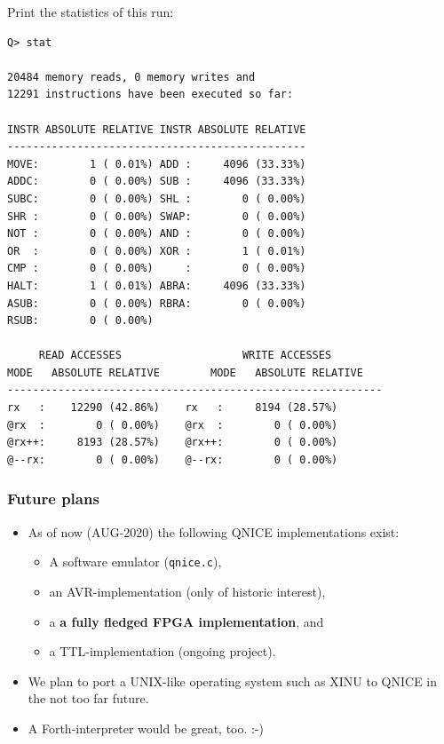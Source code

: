 \documentclass{beamer}
\begin{document}
  \begin{frame}[containsverbatim]
   \begin{description}
    \item [Print the statistics of this run:]
   \end{description}
   {\tiny
    \begin{verbatim}
Q> stat

20484 memory reads, 0 memory writes and
12291 instructions have been executed so far:

INSTR ABSOLUTE RELATIVE INSTR ABSOLUTE RELATIVE
-----------------------------------------------
MOVE:        1 ( 0.01%) ADD :     4096 (33.33%) 
ADDC:        0 ( 0.00%) SUB :     4096 (33.33%) 
SUBC:        0 ( 0.00%) SHL :        0 ( 0.00%) 
SHR :        0 ( 0.00%) SWAP:        0 ( 0.00%) 
NOT :        0 ( 0.00%) AND :        0 ( 0.00%) 
OR  :        0 ( 0.00%) XOR :        1 ( 0.01%) 
CMP :        0 ( 0.00%)     :        0 ( 0.00%) 
HALT:        1 ( 0.01%) ABRA:     4096 (33.33%) 
ASUB:        0 ( 0.00%) RBRA:        0 ( 0.00%) 
RSUB:        0 ( 0.00%) 

     READ ACCESSES                   WRITE ACCESSES
MODE   ABSOLUTE RELATIVE        MODE   ABSOLUTE RELATIVE
-----------------------------------------------------------
rx   :    12290 (42.86%)    rx   :     8194 (28.57%)
@rx  :        0 ( 0.00%)    @rx  :        0 ( 0.00%)
@rx++:     8193 (28.57%)    @rx++:        0 ( 0.00%)
@--rx:        0 ( 0.00%)    @--rx:        0 ( 0.00%)
    \end{verbatim}
   }
  \end{frame}
%
  \begin{frame}
   \frametitle{Future plans}
   \begin{itemize}
    \item As of now (AUG-2020) the following QNICE implementations 
     exist: 
     \begin{itemize}
      \item A software emulator (\texttt{qnice.c}),
      \item an AVR-implementation (only of historic interest),
      \item a \textbf{a fully fledged FPGA implementation}, and
      \item a TTL-implementation (ongoing project).
     \end{itemize}
    \item We plan to port a UNIX-like operating system such as 
     XINU to QNICE in the not too far future.
    \item A Forth-interpreter would be great, too. :-)
   \end{itemize}
  \end{frame}
\end{document}
